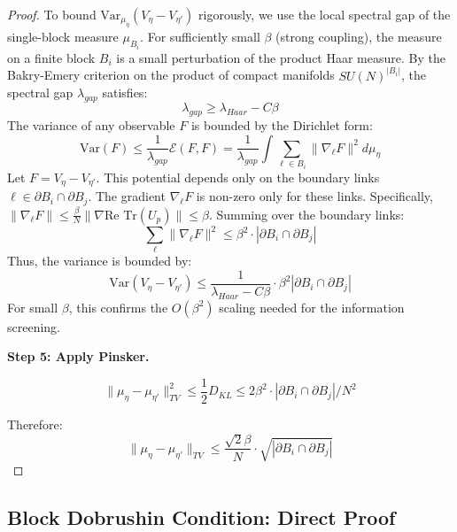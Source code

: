 \begin{proof}
To bound $\mathrm{Var}_{\mu_\eta}(V_\eta - V_{\eta'})$ rigorously, we use the local spectral gap of the single-block measure $\mu_{B_i}$.
For sufficiently small $\beta$ (strong coupling), the measure on a finite block $B_i$ is a small perturbation of the product Haar measure.
By the Bakry-Emery criterion on the product of compact manifolds $SU(N)^{|B_i|}$, the spectral gap $\lambda_{gap}$ satisfies:
\begin{equation}
\lambda_{gap} \ge \lambda_{Haar} - C \beta
\end{equation}
The variance of any observable $F$ is bounded by the Dirichlet form:
\begin{equation}
\mathrm{Var}(F) \le \frac{1}{\lambda_{gap}} \mathcal{E}(F,F) = \frac{1}{\lambda_{gap}} \int \sum_{\ell \in B_i} \|\nabla_\ell F\|^2 d\mu_\eta
\end{equation}
Let $F = V_\eta - V_{\eta'}$. This potential depends only on the boundary links $\ell \in \partial B_i \cap \partial B_j$.
The gradient $\nabla_\ell F$ is non-zero only for these links.
Specifically, $\|\nabla_\ell F\| \le \frac{\beta}{N} \| \nabla \text{Re Tr}(U_p) \| \le \beta$.
Summing over the boundary links:
\begin{equation}
\sum_{\ell} \|\nabla_\ell F\|^2 \le \beta^2 \cdot |\partial B_i \cap \partial B_j|
\end{equation}
Thus, the variance is bounded by:
\begin{equation}
\mathrm{Var}(V_\eta - V_{\eta'}) \le \frac{1}{\lambda_{Haar} - C\beta} \cdot \beta^2 |\partial B_i \cap \partial B_j|
\end{equation}
For small $\beta$, this confirms the $O(\beta^2)$ scaling needed for the information screening.

\textbf{Step 5: Apply Pinsker.}

\[
\|\mu_\eta - \mu_{\eta'}\|_{TV}^2 \leq \frac{1}{2} D_{KL} \leq 2\beta^2 \cdot |\partial B_i \cap \partial B_j| / N^2
\]

Therefore:
\[
\|\mu_\eta - \mu_{\eta'}\|_{TV} \leq \frac{\sqrt{2}\beta}{N} \cdot \sqrt{|\partial B_i \cap \partial B_j|}
\]
\end{proof}

\subsection{Block Dobrushin Condition: Direct Proof}

